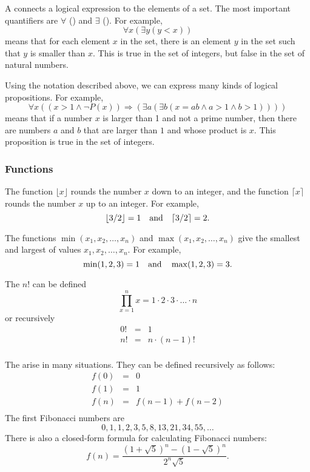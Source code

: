 
A  connects a logical expression
to the elements of a set.
The most important quantifiers are
$\forall$ () and $\exists$ ().
For example,
\[\forall x (\exists y (y < x))\]
means that for each element $x$ in the set,
there is an element $y$ in the set
such that $y$ is smaller than $x$.
This is true in the set of integers,
but false in the set of natural numbers.

Using the notation described above,
we can express many kinds of logical propositions.
For example,
\[\forall x ((x>1 \land \lnot P(x)) \Rightarrow (\exists a (\exists b (x = ab \land a > 1 \land b > 1))))\]
means that if a number $x$ is larger than 1
and not a prime number,
then there are numbers $a$ and $b$
that are larger than $1$ and whose product is $x$.
This proposition is true in the set of integers.

\subsubsection{Functions}

The function $\lfloor x \rfloor$ rounds the number $x$
down to an integer, and the function
$\lceil x \rceil$ rounds the number $x$
up to an integer. For example,
\[ \lfloor 3/2 \rfloor = 1 \hspace{10px} \textrm{and} \hspace{10px} \lceil 3/2 \rceil = 2.\]

The functions $\min(x_1,x_2,\ldots,x_n)$
and $\max(x_1,x_2,\ldots,x_n)$
give the smallest and largest of values
$x_1,x_2,\ldots,x_n$.
For example,
\[ \min(1,2,3)=1 \hspace{10px} \textrm{and} \hspace{10px} \max(1,2,3)=3.\]


The  $n!$ can be defined
\[\prod_{x=1}^n x = 1 \cdot 2 \cdot 3 \cdot \ldots \cdot n\]
or recursively
\[
\begin{array}{lcl}
0! & = & 1 \\
n! & = & n \cdot (n-1)! \\
\end{array}
\]


The  arise in many situations.
They can be defined recursively as follows:
\[
\begin{array}{lcl}
f(0) & = & 0 \\
f(1) & = & 1 \\
f(n) & = & f(n-1)+f(n-2) \\
\end{array}
\]
The first Fibonacci numbers are
\[0, 1, 1, 2, 3, 5, 8, 13, 21, 34, 55, \ldots\]
There is also a closed-form formula
for calculating Fibonacci numbers:
\[f(n)=\frac{(1 + \sqrt{5})^n - (1-\sqrt{5})^n}{2^n \sqrt{5}}.\]

